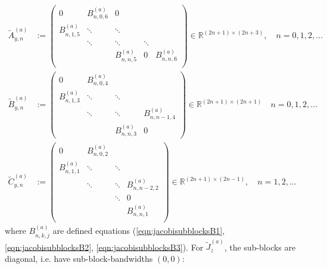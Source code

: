 \documentclass[11pt, oneside]{article}   	%
\newcommand{\R}{\mathbb{R}}
\begin{document}
\begin{align*}
	\tilde A^{(a)}_{y,n} &:= 
		\begin{pmatrix}
			0 & B^{(a)}_{n,0,6} & 0 & & \\
			B^{(a)}_{n,1,5} & \ddots & \ddots & & \\
			& \ddots & \ddots & \ddots & \\
			& & B^{(a)}_{n,n,5} & 0 & B^{(a)}_{n,n,6} \\
		\end{pmatrix} \in \R^{(2n+1)\times(2n+3)}, \quad n = 0,1,2,\dots \\
	\tilde B^{(a)}_{y,n} &:= 
		\begin{pmatrix}
			0 & B^{(a)}_{n,0,4} & & \\
			B^{(a)}_{n,1,3} & \ddots & \ddots & \\
			& \ddots & \ddots & B^{(a)}_{n,n-1,4} \\
			& & B^{(a)}_{n,n,3} & 0
		\end{pmatrix} \in \R^{(2n+1)\times(2n+1)}  \quad n = 0,1,2,\dots \\
	\tilde C^{(a)}_{y,n} &:= 
		\begin{pmatrix}
			0 & B^{(a)}_{n,0,2} & & \\
			B^{(a)}_{n,1,1} & \ddots & \ddots & \\
			& \ddots & \ddots & B^{(a)}_{n,n-2,2} \\
			& & \ddots & 0 \\
			& & & B^{(a)}_{n,n,1} \\
		\end{pmatrix} \in \R^{(2n+1)\times(2n-1)}, \quad n = 1,2,\dots
\end{align*}
where $B^{(a)}_{n,k,j}$ are defined equations (\ref{eqn:jacobisubblocksB1}, \ref{eqn:jacobisubblocksB2}, \ref{eqn:jacobisubblocksB3}). For $\tilde J_z^{(a)}$, the sub-blocks are diagonal, i.e. have sub-block-bandwidths $(0,0)$:
\end{document}
